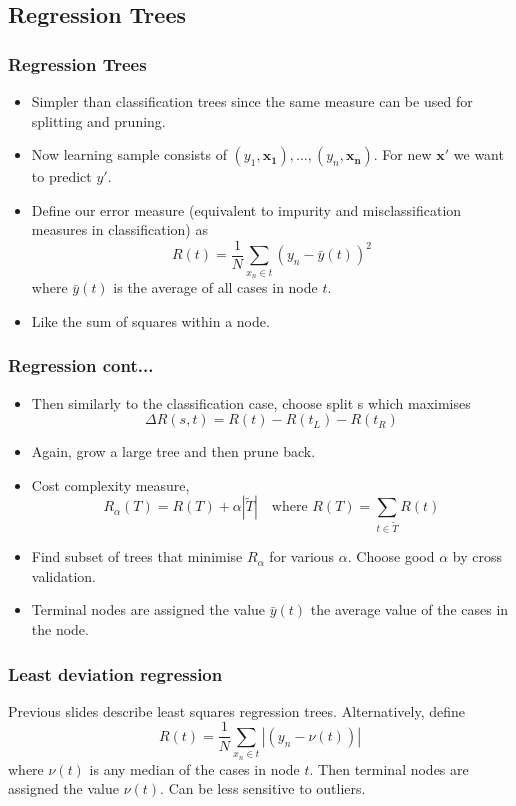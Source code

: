\documentclass{beamer}
\begin{document}
\subsection{Regression Trees}
\begin{frame}
	\frametitle{Regression Trees}
	\begin{itemize}
		\item Simpler than classification trees since the same measure can be used for splitting and pruning.
		\item Now learning sample consists of $(y_1, \pmb{x_1}), \ldots, (y_n, \pmb{x_n})$. For new $\pmb{x'}$ we want to predict $y'$.
		\item Define our error measure (equivalent to impurity and misclassification measures in classification) as
		\[
		R(t) = \frac{1}{N}\sum_{x_n \in t} (y_n - \bar{y}(t))^2
		\]
		where $\bar{y}(t)$ is the average of all cases in node $t$.
		\item Like the sum of squares within a node.
	\end{itemize}
\end{frame}
\begin{frame}
	\frametitle{Regression cont...}
	\begin{itemize}
		\item Then similarly to the classification case, choose split s which maximises 
		\[
		\Delta R(s,t) = R(t) - R(t_L) - R(t_R)
		\]
		\item Again, grow a large tree and then prune back.
		\item Cost complexity measure,
		\[
		R_\alpha(T) = R(T) + \alpha |\widetilde{T}| \quad \text{where } R(T) = \sum_{t \in \widetilde{T}} R(t)
		\]
		\item Find subset of trees that minimise $R_\alpha$ for various $\alpha$.  Choose good $\alpha$ by cross validation.
		\item 
		Terminal nodes are assigned the value $\bar{y}(t)$ the average value of the cases in the node.
	\end{itemize}
	
\end{frame}
\begin{frame}
	\frametitle{Least deviation regression}
	Previous slides describe least squares regression trees.
	Alternatively, define 
	\[
	R(t) = \frac{1}{N}\sum_{x_n \in t} |(y_n - \nu(t))|
	\]
	where $\nu(t)$ is any median of the cases in node $t$.
	Then terminal nodes are assigned the value $\nu(t)$.
	Can be less sensitive to outliers.
\end{frame}
\end{document}
